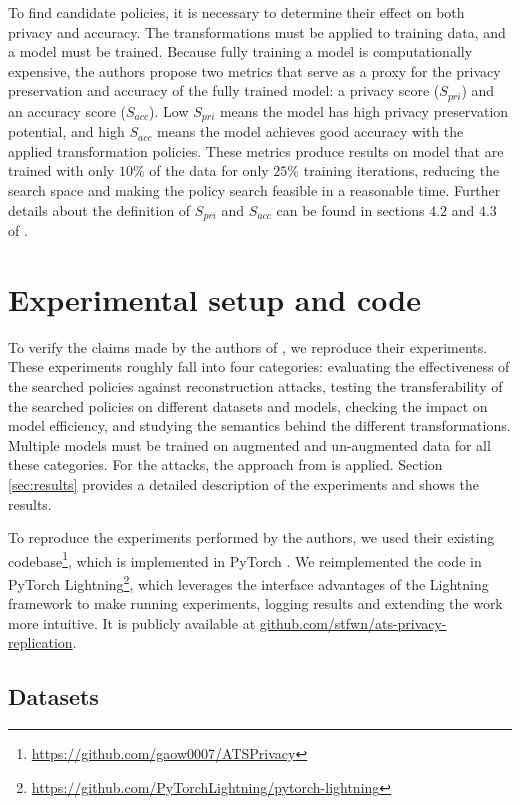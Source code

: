 To find candidate policies, it is necessary to determine their effect on both privacy and accuracy. The transformations must be applied to training data, and a model must be trained. Because fully training a model is computationally expensive, the authors propose two metrics that serve as a proxy for the privacy preservation and accuracy of the fully trained model: a privacy score ($S_{pri}$) and an accuracy score ($S_{acc}$). Low $S_{pri}$ means the model has high privacy preservation potential, and high $S_{acc}$ means the model achieves good accuracy with the applied transformation policies. These metrics produce results on model that are trained with only $10\%$ of the data for only $25\%$ training iterations, reducing the search space and making the policy search feasible in a reasonable time. Further details about the definition of $S_{pri}$ and $S_{acc}$ can be found in sections $4.2$ and $4.3$ of \cite{gao2021privacy}.

\section{Experimental setup and code}

To verify the claims made by the authors of \cite{gao2021privacy}, we reproduce their experiments. These experiments roughly fall into four categories: evaluating the effectiveness of the searched policies against reconstruction attacks, testing the transferability of the searched policies on different datasets and models, checking the impact on model efficiency, and studying the semantics behind the different transformations. Multiple models must be trained on augmented and un-augmented data for all these categories. For the attacks, the approach from \cite{geiping2020inverting} is applied. Section \ref{sec:results} provides a detailed description of the experiments and shows the results.

To reproduce the experiments performed by the authors, we used their existing codebase\footnote{\url{https://github.com/gaow0007/ATSPrivacy}}, which is implemented in PyTorch \cite{pytorch2019}. We reimplemented the code in PyTorch Lightning\footnote{\url{https://github.com/PyTorchLightning/pytorch-lightning}}, which leverages the interface advantages of the Lightning framework to make running experiments, logging results and extending the work more intuitive. It is publicly available at \url{github.com/stfwn/ats-privacy-replication}.

\subsection{Datasets}

